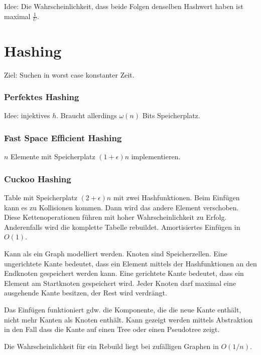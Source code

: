 Idee: Die Wahrscheinlichkeit, dass beide Folgen denselben Hashwert haben ist maximal $\frac{1}{U}$.

\section{Hashing}
Ziel: Suchen in worst case konstanter Zeit.
\subsubsection{Perfektes Hashing}
Idee: injektives $h$. Braucht allerdings $\omega(n)$ Bits Speicherplatz.

\subsubsection{Fast Space Efficient Hashing}
$n$ Elemente mit Speicherplatz $(1+\epsilon)n$ implementieren.

\subsubsection{Cuckoo Hashing}
Table mit Speicherplatz $(2+\epsilon)n$ mit zwei Hashfunktionen.
Beim Einfügen kann es zu Kollisionen kommen. Dann wird das andere Element verschoben. Diese Kettenoperationen führen mit hoher Wahrscheinlichkeit zu Erfolg. Anderenfalls wird die komplette Tabelle rebuildet. Amortisiertes Einfügen in $O(1)$. 

Kann als ein Graph modelliert werden. Knoten sind Speicherzellen. Eine ungerichtete Kante bedeutet, dass ein Element mittels der Hashfunktionen an den Endknoten gespeichert werden kann. Eine gerichtete Kante bedeutet, dass ein Element am Startknoten gespeichert wird. Jeder Knoten darf maximal eine ausgehende Kante besitzen, der Rest wird verdrängt. 

Das Einfügen funktioniert gdw. die Komponente, die die neue Kante enthält, nicht mehr Kanten als Knoten enthält. Kann gezeigt werden mittels Abstraktion in den Fall dass die Kante auf einen Tree oder einen Pseudotree zeigt.

Die Wahrscheinlichkeit für ein Rebuild liegt bei zufälligen Graphen in $O(1/n)$.




